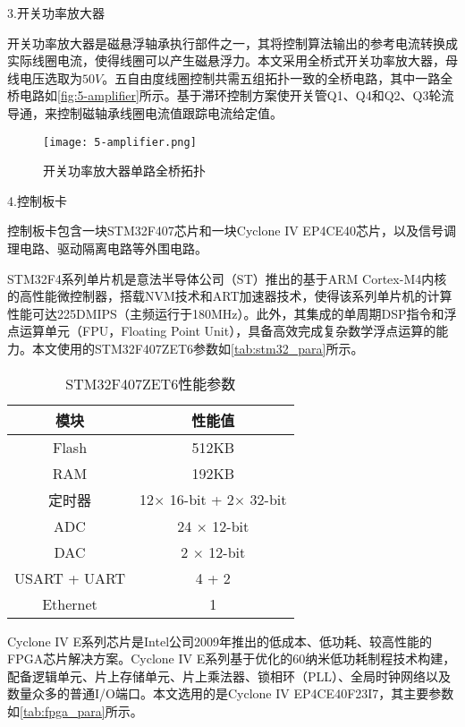 3.开关功率放大器

开关功率放大器是磁悬浮轴承执行部件之一，其将控制算法输出的参考电流转换成实际线圈电流，使得线圈可以产生磁悬浮力。本文采用全桥式开关功率放大器，母线电压选取为$50V$。五自由度线圈控制共需五组拓扑一致的全桥电路，其中一路全桥电路如\autoref{fig:5-amplifier}所示。基于滞环控制方案使开关管Q1、Q4和Q2、Q3轮流导通，来控制磁轴承线圈电流值跟踪电流给定值。
\begin{figure}
	\texttt{[image: 5-amplifier.png]}
	\caption{开关功率放大器单路全桥拓扑}
	\label{fig:5-amplifier}
\end{figure}


4.控制板卡

控制板卡包含一块STM32F407芯片和一块Cyclone IV EP4CE40芯片，以及信号调理电路、驱动隔离电路等外围电路。

STM32F4系列单片机是意法半导体公司（ST）推出的基于ARM Cortex-M4内核的高性能微控制器，搭载NVM技术和ART加速器技术，使得该系列单片机的计算性能可达225DMIPS（主频运行于180MHz）。此外，其集成的单周期DSP指令和浮点运算单元（FPU，Floating Point Unit），具备高效完成复杂数学浮点运算的能力。本文使用的STM32F407ZET6参数如\autoref{tab:stm32_para}所示。

\begin{table}[htb]
  \caption[STM32F407ZET6性能参数]{STM32F407ZET6性能参数\label{tab:stm32_para}}
  \begin{tabular}{cc}
    \toprule
    模块 & 性能值 \\
    \midrule
    Flash & 512KB\\
    RAM & 192KB\\
    定时器 & 12$\times$ 16-bit + 2$\times$ 32-bit\\
    ADC & 24 $\times$ 12-bit\\
    DAC & 2 $\times$ 12-bit\\
    USART + UART & 4 + 2\\
    Ethernet & 1	\\
    \bottomrule
  \end{tabular}
\end{table}

Cyclone IV E系列芯片是Intel公司2009年推出的低成本、低功耗、较高性能的FPGA芯片解决方案。Cyclone IV E系列基于优化的60纳米低功耗制程技术构建，配备逻辑单元、片上存储单元、片上乘法器、锁相环（PLL）、全局时钟网络以及数量众多的普通I/O端口。本文选用的是Cyclone IV EP4CE40F23I7，其主要参数如\autoref{tab:fpga_para}所示。

